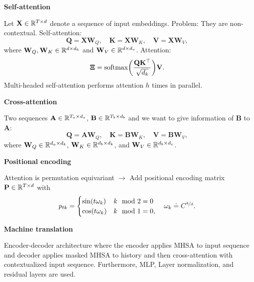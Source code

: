 \documentclass[10pt]{article}
\newenvironment{topic}[1]
{\textbf{\sffamily \footnotesize \colorbox{black}{\rlap{\textbf{\textcolor{white}{#1}}}\hspace{\linewidth}\hspace{-2\fboxsep}}}}
{}
\newenvironment{subtopic}[1]
{\vspace{0.1cm} \begin{center}\textbf{\footnotesize \sffamily #1}\end{center}}
{}
\renewcommand{\mat}[1]{\ensuremath{\mathbf{#1}}}
\begin{document}
\begin{multicols*}{3}
\begin{topic}{Recurrent neural networks}
    \end{topic}

    \begin{topic}{Transformers}

        \begin{subtopic}{Self-attention}
            Let $\mat{X} \in \R^{T \times d}$ denote a sequence of input embeddings. Problem: They are non-contextual. Self-attention: \[
                \mat{Q} = \mat{X} \mat{W}_Q, \quad \mat{K} = \mat{X} \mat{W}_K, \quad \mat{V} = \mat{X}\mat{W}_V,
            \]
            where $\mat{W}_Q, \mat{W}_K \in \R^{d\times d_k}$ and $\mat{W}_V \in \R^{d \times d_v}$. Attention: \[
                \mat{\Xi} = \mathrm{softmax} \lft( \frac{\mat{Q} \transpose{\mat{K}}}{\sqrt{d_k}} \rgt) \mat{V}.
            \]
            Multi-headed self-attention performs attention $h$ times in parallel.
        \end{subtopic}

        \begin{subtopic}{Cross-attention}
            Two sequences $\mat{A} \in \R^{T_a \times d_a}$, $\mat{B} \in \R^{T_b \times d_b}$ and we want to give information of $\mat{B}$ to $\mat{A}$: \[
                \mat{Q} = \mat{A}\mat{W}_Q, \quad \mat{K} = \mat{B} \mat{W}_K, \quad \mat{V} = \mat{B}\mat{W}_V,
            \]
            where $\mat{W}_Q \in \R^{d_a \times d_k}$, $\mat{W}_K \in \R^{d_b\times d_k}$, and $\mat{W}_V \in
                \R^{d_b \times d_v}$.

        \end{subtopic}

        \begin{subtopic}{Positional encoding}
            Attention is permutation equivariant $\to$ Add positional encoding matrix $\mat{P} \in \R^{T \times d}$ with \[
                p_{tk} = \begin{cases}
                    \sin(t \omega_k) & k \mod 2 = 0  \\
                    \cos(t \omega_k) & k \mod 1 = 0,
                \end{cases}
                \quad \omega_k \doteq C^{\nicefrac{k}{d}}.
            \]
        \end{subtopic}

        \begin{subtopic}{Machine translation}
            Encoder-decoder architecture where the encoder applies MHSA to input sequence and decoder
            applies masked MHSA to history and then cross-attention with contextualized input
            sequence. Furthermore, MLP, Layer normalization, and residual layers are used.
        \end{subtopic}


\end{topic}
\end{multicols*}
\end{document}
